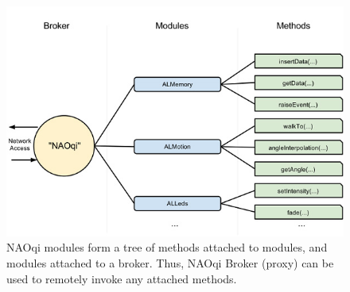 \begin{figure}
	[h] \centering 
	\includegraphics[width=120mm]{figures/content/nao-proxy.jpg} \caption{NAOqi modules form a tree of methods attached to modules, and modules attached to a broker. Thus, NAOqi Broker (proxy) can be used to remotely invoke any attached methods. \cite{nao-spec} } \label{fg:nao:proxy} 
\end{figure}
